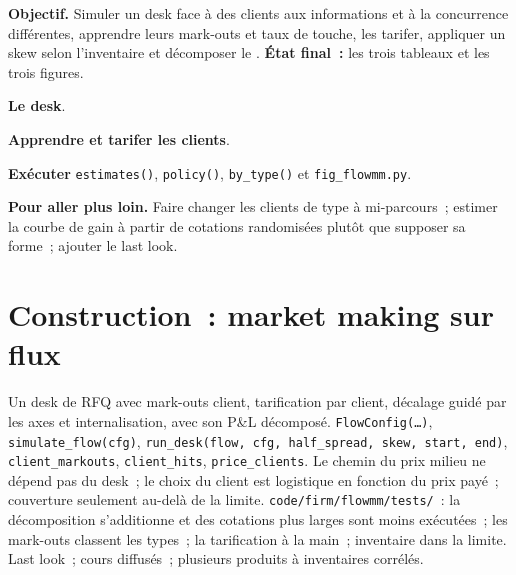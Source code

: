 \begin{tutorial}
\textbf{Objectif.} Simuler un desk face à des clients aux informations et à la concurrence différentes, apprendre leurs mark-outs et taux de touche, les tarifer, appliquer un skew
selon l'inventaire et décomposer le . \textbf{État final~:} les trois tableaux et les trois figures.
\begin{tutsteps}
\item \textbf{Le desk}.
\label{lst:s2:flow-market-making-at-a-bank:desk}
\item \textbf{Apprendre et tarifer les clients}.
\label{lst:s2:flow-market-making-at-a-bank:price}
\item \textbf{Exécuter} \texttt{estimates()}, \texttt{policy()}, \texttt{by\_type()} et \texttt{fig\_flowmm.py}.
\end{tutsteps}
\textbf{Pour aller plus loin.} Faire changer les clients de type à mi-parcours~; estimer la courbe de gain à partir de cotations randomisées plutôt que supposer sa forme~; ajouter le
last look.
\end{tutorial}

\section{Construction~: market making sur flux}\label{bld:s2:flow-market-making-at-a-bank:flowmm}

\begin{build}
 Un desk de RFQ avec mark-outs client, tarification par client, décalage guidé par les axes et internalisation, avec son P\&L décomposé.
 \texttt{FlowConfig(\dots)}, \texttt{simulate\_flow(cfg)}, \texttt{run\_desk(flow, cfg, half\_spread, skew, start, end)},
\texttt{client\_markouts}, \texttt{client\_hits}, \texttt{price\_clients}.
 Le chemin du prix milieu ne dépend pas du desk~; le choix du client est logistique en fonction du prix payé~; couverture seulement au-delà de la limite.
 \texttt{code/firm/flowmm/tests/}~: la décomposition s'additionne et des cotations plus larges sont moins exécutées~; les mark-outs classent les types~; la tarification
à la main~; inventaire dans la limite.
 Last look~; cours diffusés~; plusieurs produits à inventaires corrélés.
\end{build}

